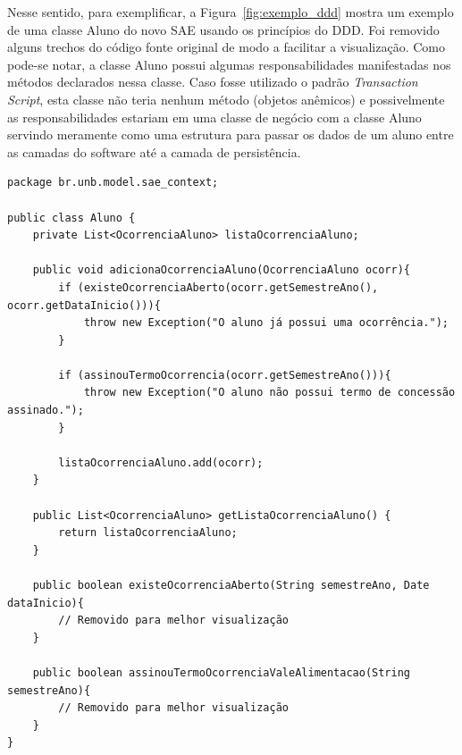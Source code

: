 Nesse sentido, para exemplificar, a Figura~\ref{fig:exemplo_ddd} mostra um exemplo de uma classe Aluno do novo \acrshort{SAE} usando os princípios do \acrshort{DDD}. Foi removido alguns trechos do código fonte original de modo a facilitar a visualização. Como pode-se notar, a classe Aluno possui algumas responsabilidades manifestadas nos métodos declarados nessa classe. Caso fosse utilizado o padrão \textit{Transaction Script}, esta classe não teria nenhum método (objetos anêmicos) e possivelmente as responsabilidades estariam em uma classe de negócio com a classe Aluno servindo meramente como uma estrutura para passar os dados de um aluno entre as camadas do software até a camada de persistência.

\renewcommand{\lstlistingname}{Código}
\begin{lstlisting}[caption=Exemplo da classe Aluno do sistema SAE, label=fig:exemplo_ddd]
package br.unb.model.sae_context;

public class Aluno {
	private List<OcorrenciaAluno> listaOcorrenciaAluno;

	public void adicionaOcorrenciaAluno(OcorrenciaAluno ocorr){
		if (existeOcorrenciaAberto(ocorr.getSemestreAno(), ocorr.getDataInicio())){
			throw new Exception("O aluno já possui uma ocorrência.");
		}
		
		if (assinouTermoOcorrencia(ocorr.getSemestreAno())){
			throw new Exception("O aluno não possui termo de concessão assinado.");
		}
		
		listaOcorrenciaAluno.add(ocorr);
	}
	
	public List<OcorrenciaAluno> getListaOcorrenciaAluno() {
		return listaOcorrenciaAluno;
	}

	public boolean existeOcorrenciaAberto(String semestreAno, Date dataInicio){
		// Removido para melhor visualização
	}
	
	public boolean assinouTermoOcorrenciaValeAlimentacao(String semestreAno){
		// Removido para melhor visualização
	}
}
\end{lstlisting}





